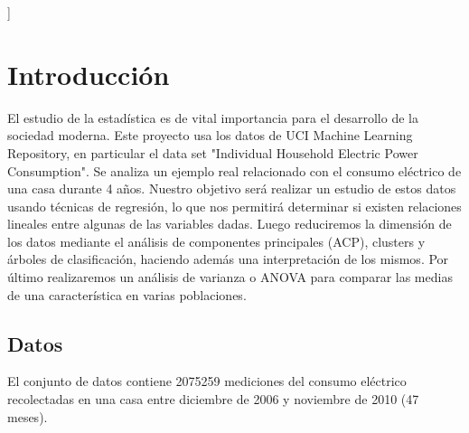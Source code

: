 \documentclass[a4paper,10pt,twocolumn]{report}
\begin{document}
\vspace{0.8cm}
]



\section{Introducción}\label{sec:intro}
 
 El estudio de la estadística es de vital importancia para el desarrollo de la sociedad moderna. Este proyecto usa los datos de UCI Machine Learning Repository, en particular el data set "Individual Household Electric Power Consumption". Se analiza un ejemplo real relacionado con el consumo eléctrico de una casa durante 4 años. Nuestro objetivo será realizar un estudio de estos datos usando técnicas de regresión, lo que nos permitirá determinar si existen relaciones lineales entre algunas de las variables dadas. Luego reduciremos la dimensión de los datos mediante el análisis de componentes principales (ACP), clusters y árboles de clasificación, haciendo además una interpretación de los mismos. Por último realizaremos un análisis de varianza o ANOVA para comparar las medias de una característica en varias poblaciones.


	\subsection{Datos}\label{sub:datos}
	El conjunto de datos contiene 2075259 mediciones del consumo eléctrico recolectadas en una casa entre diciembre de 2006 y noviembre de 2010 (47 meses).
	
\end{document}
